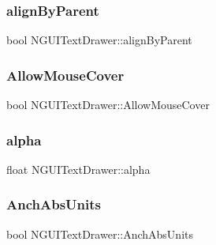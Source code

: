 \subsubsection{\texorpdfstring{align\+By\+Parent}{alignByParent}}
{\footnotesize\ttfamily bool N\+G\+U\+I\+Text\+Drawer\+::align\+By\+Parent}

\hypertarget{class_n_g_u_i_text_drawer_a56e8f928345026681e575207e78b716f}{}\label{class_n_g_u_i_text_drawer_a56e8f928345026681e575207e78b716f} 
\subsubsection{\texorpdfstring{Allow\+Mouse\+Cover}{AllowMouseCover}}
{\footnotesize\ttfamily bool N\+G\+U\+I\+Text\+Drawer\+::\+Allow\+Mouse\+Cover}

\hypertarget{class_n_g_u_i_text_drawer_a4730f4bf9cacc7e9fce124c88ef6ec87}{}\label{class_n_g_u_i_text_drawer_a4730f4bf9cacc7e9fce124c88ef6ec87} 
\subsubsection{\texorpdfstring{alpha}{alpha}}
{\footnotesize\ttfamily float N\+G\+U\+I\+Text\+Drawer\+::alpha}

\hypertarget{class_n_g_u_i_text_drawer_ae75ba22ccebc754adf4a08375a08921e}{}\label{class_n_g_u_i_text_drawer_ae75ba22ccebc754adf4a08375a08921e} 
\subsubsection{\texorpdfstring{Anch\+Abs\+Units}{AnchAbsUnits}}
{\footnotesize\ttfamily bool N\+G\+U\+I\+Text\+Drawer\+::\+Anch\+Abs\+Units}

\hypertarget{class_n_g_u_i_text_drawer_ac7fb0a42cf041c2e80018439bc5d9762}{}\label{class_n_g_u_i_text_drawer_ac7fb0a42cf041c2e80018439bc5d9762} 
